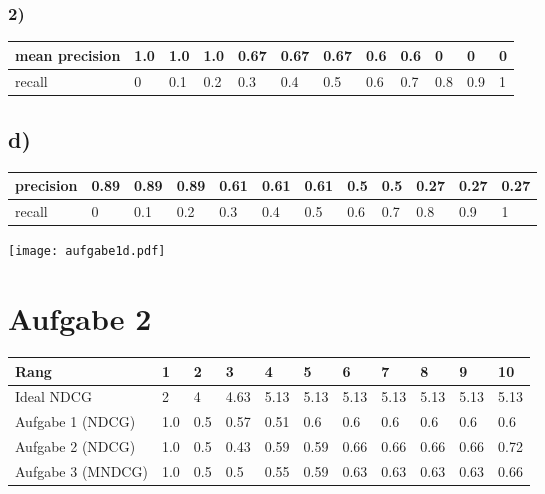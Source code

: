 \documentclass[11pt,a4paper,parskip=half ]{scrartcl}
\begin{document}
	\subsubsection*{2)}
	
	\begin{table}[H]
		\begin{tabular}{|l|l|l|l|l|l|l|l|l|l|l|l|}
			\hline
			mean precision & 1.0 & 1.0 & 1.0 & 0.67 & 0.67 & 0.67 & 0.6 & 0.6 & 0   & 0   & 0 \\ \hline
			recall    & 0   & 0.1 & 0.2 & 0.3  & 0.4  & 0.5  & 0.6 & 0.7 & 0.8 & 0.9 & 1 \\ \hline
		\end{tabular}
	\end{table}
	
	
	\subsection*{d)}
	
	\begin{table}[H]
		\begin{tabular}{|l|l|l|l|l|l|l|l|l|l|l|l|}
			\hline
			precision & 0.89 & 0.89 & 0.89 & 0.61 & 0.61 & 0.61 & 0.5 & 0.5 & 0.27 & 0.27 & 0.27 \\ \hline
			recall    & 0    & 0.1  & 0.2  & 0.3  & 0.4  & 0.5  & 0.6 & 0.7 & 0.8  & 0.9  & 1    \\ \hline
		\end{tabular}
	\end{table}

	\texttt{[image: aufgabe1d.pdf]}
	
	
	\section*{Aufgabe 2}
	
	\begin{table}[H]
		\begin{tabular}{|l|l|l|l|l|l|l|l|l|l|l|}
			\hline
			Rang	&	1	&	2	&	3	& 	4	&	5	&	6	&	7	&	8	&	9	&	10	\\
			\hline
			\hline
			Ideal NDCG			&	2	&	4	&	4.63	&	5.13	&	5.13	&	5.13	&	5.13	&	5.13	&	5.13	&	5.13	\\
			\hline
			Aufgabe 1 (NDCG)	&	1.0	&	0.5	&	0.57	&	0.51	&	0.6		&	0.6		&	0.6		&	0.6		&	0.6		&	0.6	\\
			\hline
			Aufgabe 2 (NDCG)	&	1.0	&	0.5	&	0.43	&	0.59	&	0.59	&	0.66	&	0.66	&	0.66	&  0.66 	&  0.72 	\\
			\hline
			Aufgabe 3 (MNDCG)	&	1.0	&	0.5	&	0.5		&	0.55	&	0.59	&	0.63	&	0.63	&	0.63	&	0.63	&	0.66	\\	
			\hline
		\end{tabular}
	\end{table}
	
\end{document}
